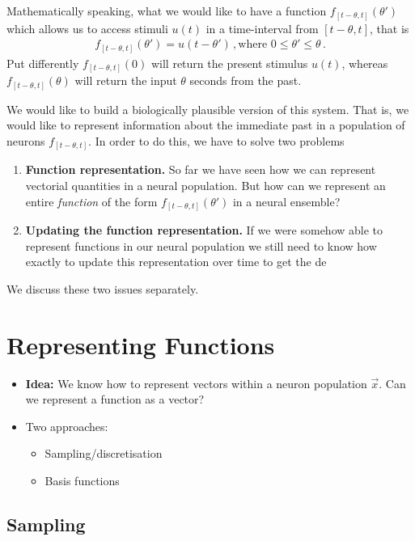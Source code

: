 \documentclass[10pt,letterpaper,oneside]{article}
\begin{document}
Mathematically speaking, what we would like to have a function $f_{[t - \theta, t]}(\theta')$ which allows us to access stimuli $u(t)$ in a time-interval from $[t - \theta, t]$, that is
\begin{align*}
	f_{[t - \theta, t]}(\theta') = u\left(t - \theta' \right) \,, \text{where } 0 \leq \theta' \leq \theta \,.
\end{align*}
Put differently $f_{[t - \theta, t]}(0)$ will return the present stimulus $u(t)$, whereas $f_{[t - \theta, t]}(\theta)$ will return the input $\theta$ seconds from the past.

We would like to build a biologically plausible version of this system. That is, we would like to represent information about the immediate past in a population of neurons $f_{[t - \theta, t]}$. In order to do this, we have to solve two problems
\begin{enumerate}[1.]
	\item \textbf{Function representation.} So far we have seen how we can represent vectorial quantities in a neural population. But how can we represent an entire \emph{function} of the form $f_{[t - \theta, t]}(\theta')$ in a neural ensemble?
	\item \textbf{Updating the function representation.} If we were somehow able to represent functions in our neural population we still need to know how exactly to update this representation over time to get the de
\end{enumerate}

We discuss these two issues separately.

\section{Representing Functions}

\begin{itemize}
	\item \textbf{Idea:} We know how to represent vectors within a neuron population $\vec x$. Can we represent a function as a vector?
	\item Two approaches:
	\begin{itemize}
		\item Sampling/discretisation
		\item Basis functions
	\end{itemize}
\end{itemize}

\subsection{Sampling}
\end{document}
